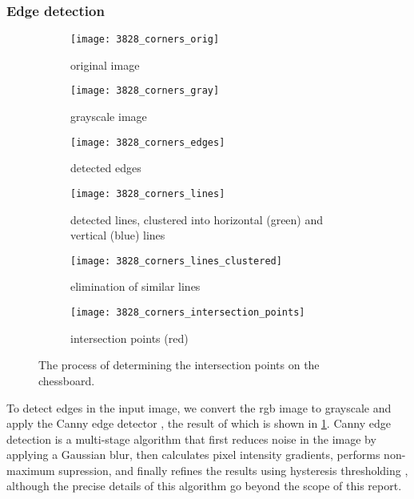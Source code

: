 \documentclass[../main.tex]{subfiles}
\begin{document}
\subsubsection{Edge detection}
\begin{figure}
    \centering
    \begin{subfigure}[t]{0.47\textwidth}
        \centering
        \texttt{[image: 3828\_corners\_orig]}
        \caption{original image}
    \end{subfigure}
    \hfill
    \begin{subfigure}[t]{0.47\textwidth}
        \centering
        \texttt{[image: 3828\_corners\_gray]}
        \caption{grayscale image}
    \end{subfigure}
    \bigskip
    \begin{subfigure}[t]{0.47\textwidth}
        \centering
        \texttt{[image: 3828\_corners\_edges]}
        \caption{detected edges}
        \label{fig:board_localisation_line_detection_edges}
    \end{subfigure}
    \hfill
    \begin{subfigure}[t]{0.47\textwidth}
        \centering
        \texttt{[image: 3828\_corners\_lines]}
        \caption{detected lines, clustered into horizontal (green) and vertical (blue) lines}
        \label{fig:board_localisation_line_detection_horizontal_vertical}
    \end{subfigure}
    \bigskip
    \begin{subfigure}[t]{0.47\textwidth}
        \centering
        \texttt{[image: 3828\_corners\_lines\_clustered]}
        \caption{elimination of similar lines}
        \label{fig:board_localisation_line_detection_elimination}
    \end{subfigure}
    \hfill
    \begin{subfigure}[t]{0.47\textwidth}
        \centering
        \texttt{[image: 3828\_corners\_intersection\_points]}
        \caption{intersection points (red)}
        \label{fig:board_localisation_line_detection_intersections}
    \end{subfigure}
    \caption{The process of determining the intersection points on the chessboard.}
    \label{fig:board_localisation_line_detection}
\end{figure}
To detect edges in the input image, we convert the \gls{rgb} image to grayscale and apply the Canny edge detector \cite{canny1986}, the result of which is shown in \cref{fig:board_localisation_line_detection_edges}.
Canny edge detection is a multi-stage algorithm that first reduces noise in the image by applying a Gaussian blur, then calculates pixel intensity gradients, performs non-maximum supression, and finally refines the results using hysteresis thresholding \cite{canny1986}, although the precise details of this algorithm go beyond the scope of this report.
\end{document}
